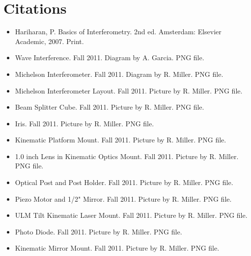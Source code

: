 \onecolumn
\section{Citations}

\begin{itemize}
\renewcommand{\labelitemi}{$\circ$}
\item Hariharan, P. Basics of Interferometry. 2nd ed. Amsterdam: Elsevier Academic, 2007. Print.
\item Wave Interference. Fall 2011. Diagram by A. Garcia. PNG file.
\item Michelson Interferometer. Fall 2011. Diagram by R. Miller. PNG file.
\item Michelson Interferometer Layout. Fall 2011. Picture by R. Miller. PNG file.
\item Beam Splitter Cube. Fall 2011. Picture by R. Miller. PNG file.
\item Iris. Fall 2011. Picture by R. Miller. PNG file.
\item Kinematic Platform Mount. Fall 2011. Picture by R. Miller. PNG file.
\item 1.0 inch Lens in Kinematic Optics Mount. Fall 2011. Picture by R. Miller. PNG file.
\item Optical Post and Post Holder. Fall 2011. Picture by R. Miller. PNG file.
\item Piezo Motor and 1/2" Mirror. Fall 2011. Picture by R. Miller. PNG file.
\item ULM Tilt Kinematic Laser Mount. Fall 2011. Picture by R. Miller. PNG file.
\item Photo Diode. Fall 2011. Picture by R. Miller. PNG file.
\item Kinematic Mirror Mount. Fall 2011. Picture by R. Miller. PNG file.
\end{itemize}